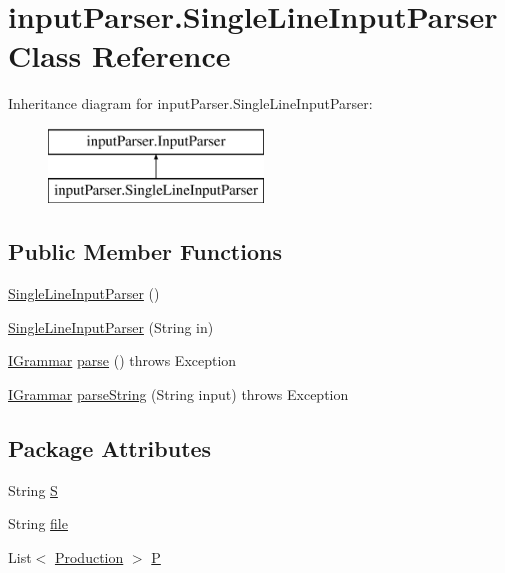 \hypertarget{classinput_parser_1_1_single_line_input_parser}{\section{input\-Parser.\-Single\-Line\-Input\-Parser Class Reference}
\label{classinput_parser_1_1_single_line_input_parser}
}
Inheritance diagram for input\-Parser.\-Single\-Line\-Input\-Parser\-:\begin{figure}[H]
\begin{center}
\leavevmode
\includegraphics[height=2.000000cm]{classinput_parser_1_1_single_line_input_parser}
\end{center}
\end{figure}
\subsection*{Public Member Functions}
\begin{DoxyCompactItemize}
\item 
\hyperlink{classinput_parser_1_1_single_line_input_parser_a27debde7d5d677d8b31d69d18622f94b}{Single\-Line\-Input\-Parser} ()
\item 
\hyperlink{classinput_parser_1_1_single_line_input_parser_a3efb0396347ec7ed7376dbd37eb4d28c}{Single\-Line\-Input\-Parser} (String in)
\item 
\hyperlink{interfacecontext_free_1_1grammar_1_1_i_grammar}{I\-Grammar} \hyperlink{classinput_parser_1_1_single_line_input_parser_ad822676b0d3182a591e2004c3bcc79d5}{parse} ()  throws Exception 
\item 
\hyperlink{interfacecontext_free_1_1grammar_1_1_i_grammar}{I\-Grammar} \hyperlink{classinput_parser_1_1_single_line_input_parser_a90641140f8686fc97fd40b72beccf0a3}{parse\-String} (String input)  throws Exception 
\end{DoxyCompactItemize}
\subsection*{Package Attributes}
\begin{DoxyCompactItemize}
\item 
String \hyperlink{classinput_parser_1_1_single_line_input_parser_afaca00d01ba13c5fc39fe11309aba895}{S}
\item 
String \hyperlink{classinput_parser_1_1_single_line_input_parser_a46401abfc8915fde62cc6109f520028a}{file}
\item 
List$<$ \hyperlink{classcontext_free_1_1grammar_1_1_production}{Production} $>$ \hyperlink{classinput_parser_1_1_single_line_input_parser_a07d3d934d89d64a72eb0a06b89e684a8}{P}
\end{DoxyCompactItemize}


